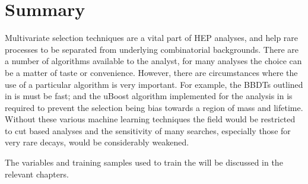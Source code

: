 \section{Summary}
Multivariate selection techniques are a vital part of \gls{HEP} analyses, and help rare
processes to be separated from underlying combinatorial backgrounds.
There are a number of algorithms available to the analyst, for many analyses the choice can be a
matter of taste or convenience.
However, there are circumstances where the use of a particular algorithm is very important.
For example, the \glspl{BBDT} outlined in  is must be fast; and the uBoost
algorithm implemented for the analysis in  is required to prevent the selection being
bias towards a region of mass and lifetime.
Without these various machine learning techniques the field would be restricted to cut based
analyses and the sensitivity of many searches, especially those for very rare decays, would be
considerably weakened.

The variables and training samples used to train the \BDTs will be discussed in the relevant
chapters.
